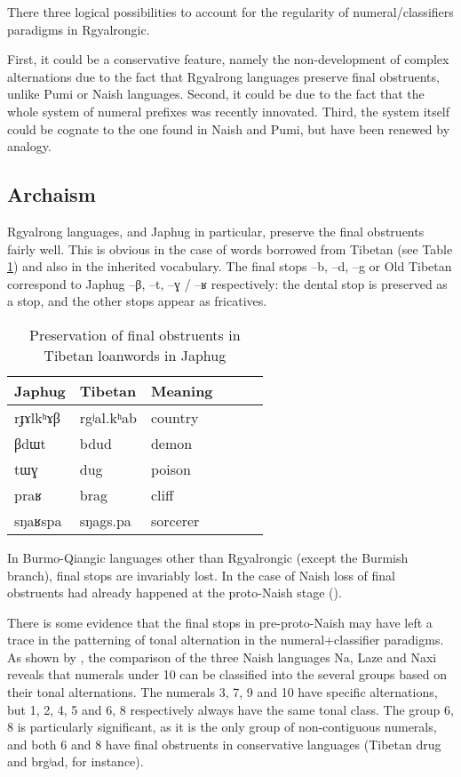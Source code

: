 \documentclass[oldfontcommands,oneside,a4paper,12pt]{article}
\newcommand{\ipa}[1]{{\phon#1}}
\begin{document}
There three logical possibilities to account for the regularity of numeral/classifiers paradigms in Rgyalrongic. 

First, it could be a conservative feature, namely the non-development of complex alternations due to the fact that Rgyalrong languages preserve final obstruents, unlike Pumi or Naish languages. Second, it could be due to the fact that the whole system of numeral prefixes was recently innovated. Third, the system itself could be cognate to the one found in Naish and Pumi, but have been renewed by analogy. 

\subsection{Archaism}

Rgyalrong languages, and Japhug in particular, preserve the final obstruents fairly well. This is obvious in the case of words borrowed from Tibetan (see Table \ref{tab:tib.borrow}) and also in the inherited vocabulary. The final stops \ipa{--b}, \ipa{--d}, \ipa{--g} or Old Tibetan correspond to Japhug \ipa{--β}, \ipa{--t}, \ipa{--ɣ} / \ipa{--ʁ} respectively: the dental stop is preserved as a stop, and the other stops appear as fricatives. 

\begin{table}[H]
\caption{Preservation of final obstruents in Tibetan loanwords in Japhug} \label{tab:tib.borrow} \centering
\begin{tabular}{llllll}
\toprule
Japhug &Tibetan & Meaning\\
\midrule
 \ipa{rɟɤlkʰɤβ}  & 	\ipa{rgʲal.kʰab}  & country 	\\
 \ipa{βdɯt}  & 	\ipa{bdud}  & demon 	\\
 \ipa{tɯɣ}  & 	\ipa{dug}  & poison 	\\
 \ipa{praʁ}  & 	\ipa{brag}  & cliff 	\\
 \ipa{sŋaʁspa}  & 	\ipa{sŋags.pa}  & sorcerer 	\\
\bottomrule
\end{tabular}
\end{table}

In Burmo-Qiangic languages other than Rgyalrongic (except the Burmish branch), final stops are invariably lost. In the case of Naish loss of final obstruents had already happened at the proto-Naish stage (\citealt{jacques.michaud11naish}).

There is some evidence that the final stops in pre-proto-Naish may have left a trace in the patterning of tonal alternation in the numeral+classifier paradigms. As shown by \citet[16-17]{michaud11cl}, the comparison of the three Naish languages Na, Laze and Naxi reveals that numerals under 10 can be classified into the several groups based on their tonal alternations. The numerals 3, 7, 9 and 10 have specific alternations, but {1, 2}, {4, 5} and {6, 8} respectively always have the same tonal class. The group {6, 8} is particularly significant, as it is the only group of non-contiguous numerals, and both 6 and 8 have final obstruents in conservative languages (Tibetan \ipa{drug} and \ipa{brgʲad}, for instance).
\end{document}

